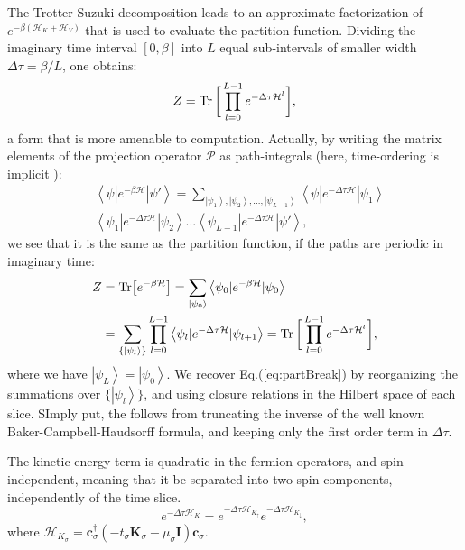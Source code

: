 The Trotter-Suzuki decomposition leads to an approximate factorization of $e^{-\beta (\mathcal{H}_K + \mathcal{H}_V )}$ that is used to evaluate the partition function.
Dividing the imaginary time interval $[0, \beta ]$ into $L$ equal sub-intervals of smaller width $\Delta \tau = \beta / L$, one obtains:
\begin{equation}\label{eq:partBreak}
Z =  \operatorname{Tr} \bigg[ \prod_{l=0}^{L-1} e^{-\Delta\tau \mathcal{H}^l } \bigg] ,
\end{equation}
a form that is more amenable to computation.
Actually, by writing the matrix elements of the projection operator $\mathcal{P}$ as path-integrals (here, time-ordering is implicit \cite{hirsch_discrete_1983}):
\begin{equation}
\begin{split}
&\left\langle \psi | e^{-\beta \mathcal{H} } | \psi' \right\rangle = \sum_{\left| \psi_1 \right\rangle, \left| \psi_2 \right\rangle,..., \left| \psi_{L-1} \right\rangle }  \left\langle \psi | e^{-\Delta \tau \mathcal{H} } | \psi_1 \right\rangle \\
&\left\langle \psi_1 | e^{-\Delta \tau \mathcal{H} } | \psi_2 \right\rangle ... \left\langle \psi_{L - 1} | e^{-\Delta \tau \mathcal{H} } | \psi' \right\rangle ,
\end{split}
\end{equation}
we see that it is the same as the partition function, if the paths are periodic in imaginary time:
\begin{equation}
\begin{split}
Z &= \text{Tr} \big[ e^{-\beta \mathcal{H} } \big] = \sum_{\left| \psi_0 \right\rangle} \left\langle \psi_0 | e^{-\beta \mathcal{H}} | \psi_0 \right\rangle \\
&= \sum_{\{ \left| \psi_l \right\rangle \}} \prod_{l = 0}^{L - 1} \left\langle \psi_{l} | e^{-\Delta \tau \mathcal{H} } | \psi_{l+1} \right\rangle = \operatorname{Tr} \bigg[ \prod_{l=0}^{L-1} e^{-\Delta\tau \mathcal{H}^l } \bigg] ,
\end{split}
\end{equation}
where we have $\left| \psi_L \right\rangle = \left| \psi_0 \right\rangle$. We recover Eq.(\ref{eq:partBreak}) by reorganizing the summations over $\{ \left| \psi_l \right\rangle \}$, and using closure relations in the Hilbert space of each slice.
SImply put, the  follows from truncating the inverse of the well known Baker-Campbell-Haudsorff formula, and keeping only the first order term in $\Delta \tau$.

The kinetic energy term is quadratic in the fermion operators, and spin-independent, meaning that it be separated into two spin components, independently of the time slice.
\begin{equation}
e^{-\Delta\tau \mathcal{H}_K} = e^{-\Delta\tau \mathcal{H}_{K_\uparrow}} e^{-\Delta\tau \mathcal{H}_{K_\downarrow}} ,
\end{equation}
where $\mathcal{H}_{K_\sigma} = \bm c_\sigma^\dagger (-t_\sigma \bm K_\sigma - \mu_\sigma \bm I )  \bm c_\sigma$.

